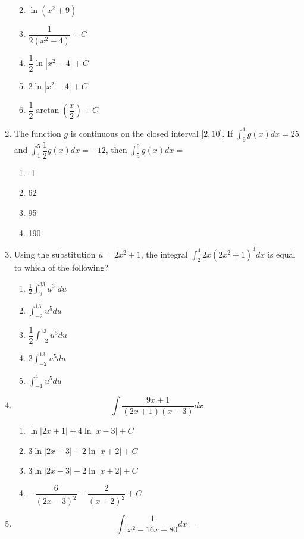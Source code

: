 \documentclass[12pt
]{article}
\providecommand{\tightlist}{%
  \setlength{\itemsep}{0pt}\setlength{\parskip}{0pt}}
\def\tightlist{}
\begin{document}
\begin{enumerate}
  \begin{enumerate}
  \def\labelenumii{\alph{enumii}.}
  \tightlist
  \item
    \(\ln (x^2+9)\)
  \item
    \(\dfrac{1}{2\left( x^{2} - 4 \right)} + C\)
  \item
    \(\dfrac{1}{2}\ln\left| x^{2} - 4 \right| + C\)
  \item
    \(2\ln\left| x^{2} - 4 \right| + C\)
  \item
    \(\dfrac{1}{2}\arctan\left( \dfrac{x}{2} \right) + C\)
  \end{enumerate}
\item
  The function \(g\) is continuous on the closed interval
  \(\lbrack 2,10\rbrack\). If \(\displaystyle \int_{9}^{1} g(x)dx = 25\)
  and \(\displaystyle \int_{1}^{5}\dfrac{1}{2}g(x)dx = - 12\), then
  \(\displaystyle \int_{5}^{9} g(x)dx =\)

  \begin{enumerate}
  \def\labelenumii{\alph{enumii}.}
  \tightlist
  \item
    -1
  \item
    62
  \item
    95
  \item
    190
  \end{enumerate}
\item
  Using the substitution \(u = 2x^{2} + 1\), the integral
  \(\displaystyle \int_{2}^{4}2x\left( 2x^2+1 \right)^{3}dx\) is equal
  to which of the following?

  \begin{enumerate}
  \def\labelenumii{\alph{enumii}.}
  \tightlist
  \item
    \(\displaystyle \frac{1}{2} \int_9^{33} u^3 \; du\)
  \item
    \(\displaystyle \int_{- 2}^{13}u^{5}du\)
  \item
    \(\dfrac{1}{2}\displaystyle \int_{- 2}^{13}u^{5}du\)
  \item
    \(2\displaystyle \int_{- 2}^{13}u^{5}du\)
  \item
    \(\displaystyle \int_{- 1}^{4}u^{5}du\)
  \end{enumerate}
\item
  \[\displaystyle \int\dfrac{9x+1}{(2x + 1)(x - 3)}dx\]

  \begin{enumerate}
  \def\labelenumii{\alph{enumii}.}
  \tightlist
  \item
    \(\ln | 2x+1 | + 4 \ln |x-3| + C\)
  \item
    \(3\ln|2x - 3| + 2\ln|x + 2| + C\)
  \item
    \(3\ln|2x - 3| - 2\ln|x + 2| + C\)
  \item
    \(- \dfrac{6}{(2x - 3)^{2}} - \dfrac{2}{(x + 2)^{2}} + C\)
  \end{enumerate}
\item
  \[\displaystyle \int\dfrac{1}{x^{2} - 16x + 80}dx =\]


\end{enumerate}
\end{document}

